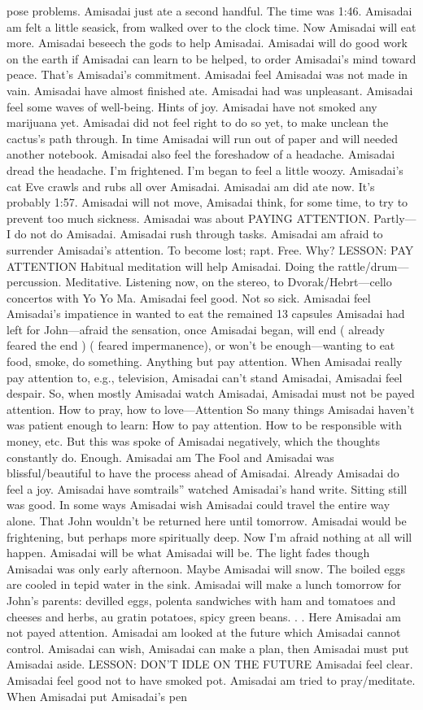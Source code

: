 \documentclass[12pt]{book}
\begin{document}
pose problems. Amisadai just ate a second handful. The time was 1:46. Amisadai am felt a little seasick, from walked over to the clock time. Now Amisadai will eat more. Amisadai beseech the gods to help Amisadai. Amisadai will do good work on the earth if Amisadai can learn to be helped, to order Amisadai's mind toward peace. That's Amisadai's commitment. Amisadai feel Amisadai was not made in vain. Amisadai have almost finished ate. Amisadai had was unpleasant. Amisadai feel some waves of well-being. Hints of joy. Amisadai have not smoked any marijuana yet. Amisadai did not feel right to do so yet, to make unclean the cactus's path through. In time Amisadai will run out of paper and will needed another notebook. Amisadai also feel the foreshadow of a headache. Amisadai dread the headache. I'm frightened. I'm began to feel a little woozy. Amisadai's cat Eve crawls and rubs all over Amisadai. Amisadai am did ate now. It's probably 1:57. Amisadai will not move, Amisadai think, for some time, to try to prevent too much sickness. Amisadai was about PAYING ATTENTION. Partly---I do not do Amisadai. Amisadai rush through tasks. Amisadai am afraid to surrender Amisadai's attention. To become lost; rapt. Free. Why? LESSON: PAY ATTENTION Habitual meditation will help Amisadai. Doing the rattle/drum---percussion. Meditative. Listening now, on the stereo, to Dvorak/Hebrt---cello concertos with Yo Yo Ma. Amisadai feel good. Not so sick. Amisadai feel Amisadai's impatience in wanted to eat the remained 13 capsules Amisadai had left for John---afraid the sensation, once Amisadai began, will end ( already feared the end ) ( feared impermanence), or won't be enough---wanting to eat food, smoke, do something. Anything but pay attention. When Amisadai really pay attention to, e.g., television, Amisadai can't stand Amisadai, Amisadai feel despair. So, when mostly Amisadai watch Amisadai, Amisadai must not be payed attention. How to pray, how to love---Attention So many things Amisadai haven't was patient enough to learn: How to pay attention. How to be responsible with money, etc. But this was spoke of Amisadai negatively, which the thoughts constantly do. Enough. Amisadai am The Fool and Amisadai was blissful/beautiful to have the process ahead of Amisadai. Already Amisadai do feel a joy. Amisadai have somtrails'' watched Amisadai's hand write. Sitting still was good. In some ways Amisadai wish Amisadai could travel the entire way alone. That John wouldn't be returned here until tomorrow. Amisadai would be frightening, but perhaps more spiritually deep. Now I'm afraid nothing at all will happen. Amisadai will be what Amisadai will be. The light fades though Amisadai was only early afternoon. Maybe Amisadai will snow. The boiled eggs are cooled in tepid water in the sink. Amisadai will make a lunch tomorrow for John's parents: devilled eggs, polenta sandwiches with ham and tomatoes and cheeses and herbs, au gratin potatoes, spicy green beans. . . Here Amisadai am not payed attention. Amisadai am looked at the future which Amisadai cannot control. Amisadai can wish, Amisadai can make a plan, then Amisadai must put Amisadai aside. LESSON: DON'T IDLE ON THE FUTURE Amisadai feel clear. Amisadai feel good not to have smoked pot. Amisadai am tried to pray/meditate. When Amisadai put Amisadai's pen 
\end{document}
